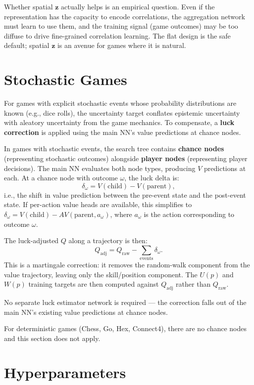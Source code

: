 \documentclass[11pt]{article}
\begin{document}
Whether spatial $\mathbf{z}$ actually helps is an empirical question. Even if
the representation has the capacity to encode correlations, the aggregation
network must learn to use them, and the training signal (game outcomes) may be
too diffuse to drive fine-grained correlation learning. The flat design is the
safe default; spatial $\mathbf{z}$ is an avenue for games where it is natural.

\section{Stochastic Games}

For games with explicit stochastic events whose probability distributions are
known (e.g., dice rolls), the uncertainty target conflates epistemic uncertainty
with aleatory uncertainty from the game mechanics. To compensate, a
\textbf{luck correction} is applied using the main NN's value predictions at
chance nodes.

In games with stochastic events, the search tree contains \textbf{chance
nodes} (representing stochastic outcomes) alongside \textbf{player nodes}
(representing player decisions). The main NN evaluates both node types,
producing $V$ predictions at each. At a chance node with outcome $\omega$,
the luck delta is:
\[
  \delta_\omega = V(\text{child}) - V(\text{parent}),
\]
i.e., the shift in value prediction between the pre-event state and the
post-event state. If per-action value heads are available, this simplifies to
$\delta_\omega = V(\text{child}) - AV(\text{parent}, a_\omega)$, where
$a_\omega$ is the action corresponding to outcome $\omega$.

The luck-adjusted $Q$ along a trajectory is then:
\[
  Q_{\text{adj}} = Q_{\text{raw}} - \sum_{\text{events}} \delta_\omega.
\]
This is a martingale correction: it removes the random-walk component from the
value trajectory, leaving only the skill/position component. The $U(p)$ and
$W(p)$ training targets are then computed against $Q_{\text{adj}}$ rather than
$Q_{\text{raw}}$.

No separate luck estimator network is required --- the correction falls out of
the main NN's existing value predictions at chance nodes.

For deterministic games (Chess, Go, Hex, Connect4), there are no chance nodes
and this section does not apply.

\section{Hyperparameters}
\end{document}
